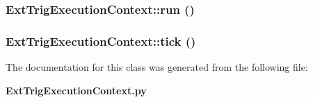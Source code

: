 \subsubsection{\setlength{\rightskip}{0pt plus 5cm}Ext\-Trig\-Execution\-Context::run ()}\label{classExtTrigExecutionContext_ExtTrigExecutionContexta3}


\subsubsection{\setlength{\rightskip}{0pt plus 5cm}Ext\-Trig\-Execution\-Context::tick ()}\label{classExtTrigExecutionContext_ExtTrigExecutionContexta2}




The documentation for this class was generated from the following file:\begin{CompactItemize}
\item 
{\bf Ext\-Trig\-Execution\-Context.py}\end{CompactItemize}
